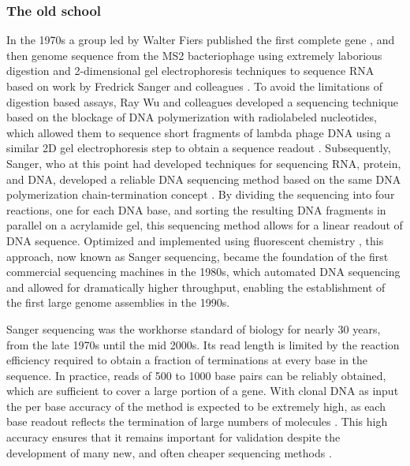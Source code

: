 \subsubsection{The old school}

In the 1970s a group led by Walter Fiers published the first complete gene \cite{jou1972nucleotide}, and then genome sequence \cite{fiers1976complete} from the MS2 bacteriophage using extremely laborious digestion and 2-dimensional gel electrophoresis techniques to sequence RNA based on work by Fredrick Sanger and colleagues \cite{sanger1965two, adams1969nucleotide}.
To avoid the limitations of digestion based assays, Ray Wu and colleagues developed a sequencing technique based on the blockage of DNA polymerization with radiolabeled nucleotides, which allowed them to sequence short fragments of lambda phage DNA using a similar 2D gel electrophoresis step to obtain a sequence readout \cite{wu1972nucleotide, padmanabhan1974chemical}.
Subsequently, Sanger, who at this point had developed techniques for sequencing RNA, protein, and DNA, developed a reliable DNA sequencing method based on the same DNA polymerization chain-termination concept \cite{sanger1977dna}.
By dividing the sequencing into four reactions, one for each DNA base, and sorting the resulting DNA fragments in parallel on a acrylamide gel, this sequencing method allows for a linear readout of DNA sequence.
Optimized and implemented using fluorescent chemistry \cite{strauss1986specific}, this approach, now known as Sanger sequencing, became the foundation of the first commercial sequencing machines in the 1980s, which automated DNA sequencing and allowed for dramatically higher throughput, enabling the establishment of the first large genome assemblies in the 1990s.

Sanger sequencing was the workhorse standard of biology for nearly 30 years, from the late 1970s until the mid 2000s.
Its read length is limited by the reaction efficiency required to obtain a fraction of terminations at every base in the sequence.
In practice, reads of 500 to 1000 base pairs can be reliably obtained, which are sufficient to cover a large portion of a gene.
With clonal DNA as input the per base accuracy of the method is expected to be extremely high, as each base readout reflects the termination of large numbers of molecules \cite{castiblanco2013primer}.
This high accuracy ensures that it remains important for validation despite the development of many new, and often cheaper sequencing methods \cite{sikkema2013targeted}.

